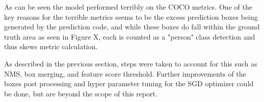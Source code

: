 As can be seen the model performed terribly on the COCO metrics. 
One of the key reasons for the terrible metrics seems to be the excess prediction boxes being generated by the prediction code, and while these boxes do fall within the ground truth area as seen in Figure X, each is counted as a "person" class detection and thus skews metric calculation.

As described in the previous section, steps were taken to account for this such as NMS, box merging, and feature score threshold. 
Further improvements of the boxes post processing and hyper parameter tuning for the SGD optimizer could be done, but are beyond the scope of this report.
